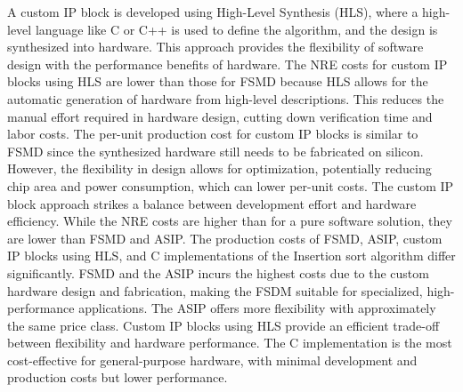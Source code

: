 \documentclass[conference]{IEEEtran}
\begin{document}
A custom IP block is developed using High-Level Synthesis (HLS), where a high-level language like C or C++ is used to define the algorithm, and the design is synthesized into hardware. This approach provides the flexibility of software design with the performance benefits of hardware. The NRE costs for custom IP blocks using HLS are lower than those for FSMD because HLS allows for the automatic generation of hardware from high-level descriptions. This reduces the manual effort required in hardware design, cutting down verification time and labor costs. The per-unit production cost for custom IP blocks is similar to FSMD since the synthesized hardware still needs to be fabricated on silicon. However, the flexibility in design allows for optimization, potentially reducing chip area and power consumption, which can lower per-unit costs. The custom IP block approach strikes a balance between development effort and hardware efficiency. While the NRE costs are higher than for a pure software solution, they are lower than FSMD and ASIP.
The production costs of FSMD, ASIP, custom IP blocks using HLS, and C implementations of the Insertion sort algorithm differ significantly. FSMD and the ASIP incurs the highest costs due to the custom hardware design and fabrication, making the FSDM suitable for specialized, high-performance applications. The ASIP offers more flexibility with approximately the same price class. Custom IP blocks using HLS provide an efficient trade-off between flexibility and hardware performance. The C implementation is the most cost-effective for general-purpose hardware, with minimal development and production costs but lower performance. 
\end{document}
